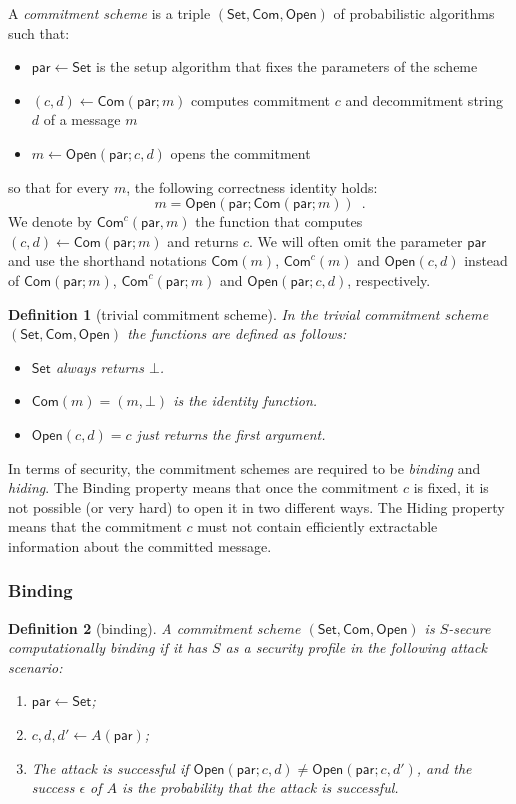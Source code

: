\documentclass{article}
\newtheorem{definition}{Definition}[section]
\newcommand{\setup}[0]{\mathsf{Set}}
\newcommand{\commit}[0]{\mathsf{Com}}
\newcommand{\open}[0]{\mathsf{Open}}
\newcommand{\commitc}[0]{{\mathsf{Com}^{c}}}
\newcommand{\param}[0]{\mathsf{par}}
\begin{document}
A \emph{commitment scheme} is a triple $(\setup, \commit, \open)$ of probabilistic algorithms such that:
\begin{itemize}
\item $\param\gets\setup$ is the setup algorithm that fixes the parameters of the scheme
\item $(c,d)\gets \commit(\param; m)$ computes commitment $c$ and
decommitment string $d$ of a message $m$
\item $m\gets \open(\param; c, d)$ opens the commitment
\end{itemize}
so that for every $m$, the following correctness identity holds:
\[
m=\open(\param; \commit(\param; m))\enspace.
\]
We denote by $\commitc(\param,m)$ the function that computes $(c,d)\gets \commit(\param; m)$ and returns $c$.
We will often omit the parameter $\param$ and use the shorthand notations $\commit(m)$, $\commitc(m)$ and $\open(c,d)$ instead of $\commit(\param; m)$,
$\commitc(\param; m)$ and $\open(\param; c, d)$, respectively.
\medskip

\begin{definition}[trivial commitment scheme]
In the trivial commitment scheme $(\setup,\commit,\open)$ the functions are defined as follows:
\begin{itemize}
\item $\setup$ always returns $\bot$.
\item $\commit(m)=(m,\bot)$ is the identity function.
\item $\open (c,d) = c$ just returns the first argument.
\end{itemize}
\end{definition}

\noindent In terms of security, the commitment schemes are required to be \emph{binding} and \emph{hiding}. The Binding property means that once the commitment $c$ is fixed, it is not possible (or very hard) to open it in two different ways. The Hiding property means that the commitment $c$ must not contain efficiently extractable information about the committed message.

\subsubsection{Binding}

\begin{definition}[binding]
A commitment scheme $(\setup, \commit, \open)$ is $S$-secure computationally binding if it has $S$ as a security profile in the following attack scenario:
\begin{enumerate}
\item $\param\gets\setup$;
\item $c,d,d'\gets A(\param)$;
\item The attack is successful if $\open(\param; c, d)\neq\open(\param; c, d')$,
and the success $\epsilon$ of $A$ is the probability that the attack is successful.
\end{enumerate}
\end{definition}
\end{document}
